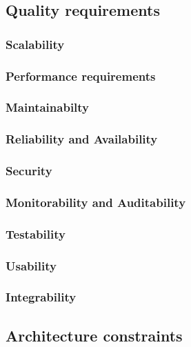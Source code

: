 \documentclass[10pt]{article}
\begin{document}
\subsection{Quality requirements} %
\subsubsection{Scalability}

\subsubsection{Performance requirements}

\subsubsection{Maintainabilty}

\subsubsection{Reliability and Availability}

\subsubsection{Security}

\subsubsection{Monitorability and Auditability}

\subsubsection{Testability}

\subsubsection{Usability}

\subsubsection{Integrability}


\clearpage

\subsection{Architecture constraints} %
\end{document}
